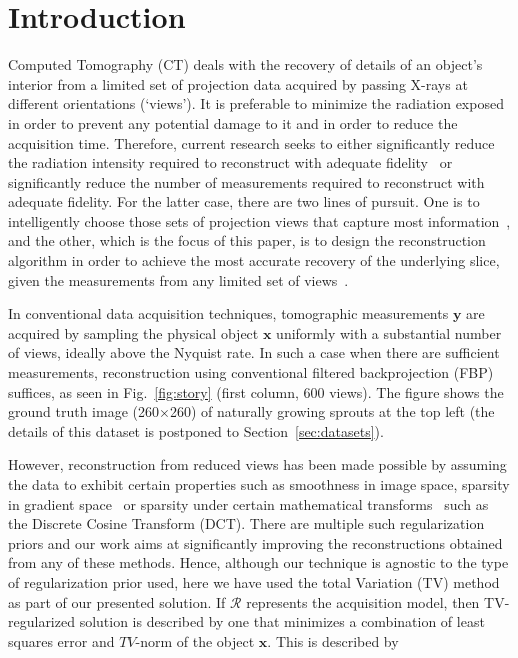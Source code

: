 \documentclass[journal]{IEEEtran}
\begin{document}
\section{Introduction}
\label{sec:intro}
Computed Tomography (CT) deals with the recovery of details of an
object's interior
from a limited set of projection data acquired by passing
X-rays at different orientations (`views'). It is preferable to
minimize the radiation exposed in order to prevent any potential
damage to it and in order to reduce the acquisition time. Therefore,
current research seeks to either significantly reduce the radiation
intensity required to reconstruct with adequate
fidelity~\cite{yang2018,Lin2016,Xie2017,gopal2019low} or significantly
reduce the number of measurements required to reconstruct with
adequate fidelity. For the latter case, there are two lines of
pursuit. One is to intelligently choose those sets of projection views
that capture most
information~\cite{King2018,Anthony2018,barkan17,fischer16,andrei14},
and the other, which is the focus of this paper, is to design the
reconstruction algorithm in order to achieve the most accurate
recovery of the underlying slice, given the measurements from any
limited set of views~\cite{yang2018,geyer2015,kilic2011}.

In conventional data acquisition techniques, tomographic
measurements $\boldsymbol{y}$ are acquired by sampling the physical
object $\boldsymbol{x}$ uniformly with a substantial number of views,
ideally above the Nyquist rate. In such a case when there are
sufficient measurements, reconstruction using conventional
filtered backprojection (FBP) suffices, as seen in
Fig.~\ref{fig:story} (first column, 600 views). The figure shows the
ground truth image (260$\times$260) of naturally growing sprouts at the top
left (the details of this dataset is postponed to
Section~\ref{sec:datasets}).

However, reconstruction from reduced views has
been made possible by assuming the data to exhibit certain properties such as
smoothness in image space, sparsity in gradient space~\cite{TV} or sparsity under
certain mathematical transforms~\cite{Donoho,introCS} such as the Discrete Cosine Transform (DCT).  There are multiple such regularization priors and our work aims at significantly improving
the reconstructions obtained from any of these methods. Hence, although our technique is agnostic to the type of regularization prior used, here we have used the total Variation (TV) method as part of our presented solution. If $\boldsymbol{\mathcal{R}}$ represents the acquisition model, then TV-regularized solution is described by one that minimizes a combination of
least squares error and $TV$-norm  of the object $\boldsymbol{x}$. This is described by
\end{document}
